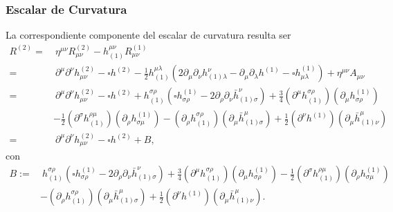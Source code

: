 \subsubsection{Escalar de Curvatura}
La correspondiente componente del escalar de curvatura resulta ser
\begin{align}
R^{(2)} = &\ \eta^{\mu\nu}R^{(2)}_{\mu\nu}-h_{(1)}^{\mu\nu}R^{(1)}_{\mu\nu} \\
= &\ \partial^\mu\partial^\nu h^{(2)}_{\mu\nu} - \square h^{(2)}
-\frac{1}{2}h_{(1)}^{\mu\lambda}\left(2\partial_\mu\partial_\nu h^\nu_{(1)\lambda}
- \partial_\mu\partial_\lambda h^{(1)} -\square h^{(1)}_{\mu\lambda}\right)
+ \eta^{\mu\nu}A_{\mu\nu} \\
= &\ \partial^\mu\partial^\nu h^{(2)}_{\mu\nu} - \square h^{(2)}
+h_{(1)}^{\sigma\rho}\left(\square h^{(1)}_{\sigma\rho}
-2\partial_\rho\partial_\nu \bar{h}^\nu_{(1)\sigma}\right)
+\frac{3}{4}(\partial^\mu h_{(1)}^{\sigma\rho})(\partial_\mu h^{(1)}_{\sigma\rho}) \\
& -\frac{1}{2}(\partial^\sigma h_{(1)}^{\rho\mu})(\partial_\rho h^{(1)}_{\sigma\mu})
-(\partial_\rho h_{(1)}^{\sigma\rho})(\partial_\mu \bar{h}^\mu_{(1)\sigma})
+\frac{1}{2}(\partial^\nu h^{(1)})(\partial_\mu \bar{h}^\mu_{(1)\nu})\\
= &\ \partial^\mu\partial^\nu h^{(2)}_{\mu\nu} - \square h^{(2)}
+B,
\end{align}
con
\begin{align}
B := &\ h_{(1)}^{\sigma\rho}\left(\square h^{(1)}_{\sigma\rho}
-2\partial_\rho\partial_\nu \bar{h}^\nu_{(1)\sigma}\right)
+\frac{3}{4}(\partial^\mu h_{(1)}^{\sigma\rho})(\partial_\mu h^{(1)}_{\sigma\rho}) -\frac{1}{2}(\partial^\sigma h_{(1)}^{\rho\mu})(\partial_\rho h^{(1)}_{\sigma\mu}) \nonumber \\
& -(\partial_\rho h_{(1)}^{\sigma\rho})(\partial_\mu \bar{h}^\mu_{(1)\sigma})
+\frac{1}{2}(\partial^\nu h^{(1)})(\partial_\mu \bar{h}^\mu_{(1)\nu})
. \label{defB}
\end{align}

